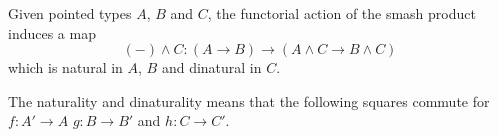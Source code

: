 \documentclass{article}
\newcommand{\pmap}{\to}
\renewcommand{\smash}{\wedge}
\begin{document}
\begin{thm}\label{thm:smash-functor-right}
Given pointed types $A$, $B$ and $C$, the functorial action of the smash product induces a map
$$({-})\smash C:(A\pmap B)\pmap(A\smash C\pmap B\smash C)$$
which is natural in $A$, $B$ and dinatural in $C$.
\end{thm}
The naturality and dinaturality means that the following squares commute for $f : A' \to A$ $g:B\to B'$ and $h:C\to C'$.
\begin{center}
\end{center}
\end{document}
